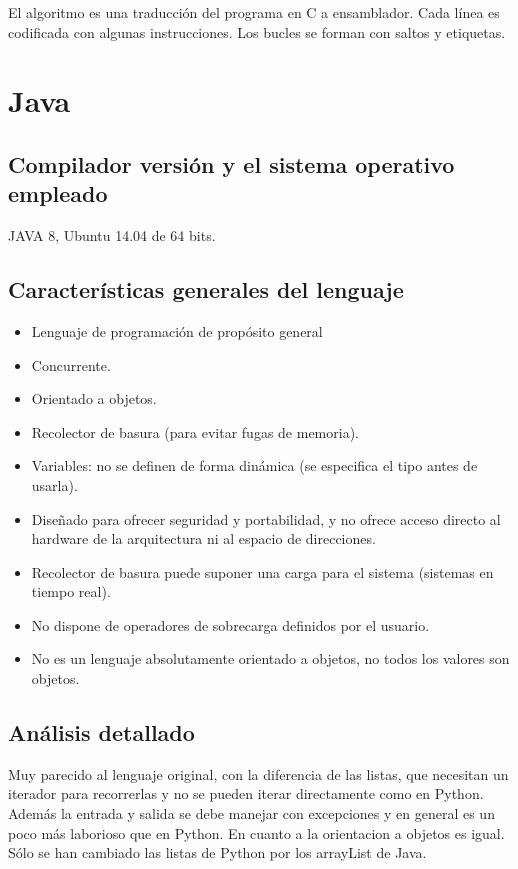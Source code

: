\documentclass[12pt,a4paper]{article}
\begin{document}
El algoritmo es una traducción del programa en C a ensamblador. Cada línea es 
codificada con algunas instrucciones. Los bucles se forman con saltos y 
etiquetas.

  
\section{Java}

\subsection{Compilador versión y el sistema operativo empleado}
JAVA 8, Ubuntu 14.04 de 64 bits.


\subsection{Características generales del lenguaje}
\begin{itemize}
\item Lenguaje de programación de propósito general
\item Concurrente.
\item Orientado a objetos.
\item Recolector de basura (para evitar fugas de memoria).
\item Variables: no se definen de forma dinámica (se especifica el tipo antes de 
usarla).
\item Diseñado para ofrecer seguridad y portabilidad, y no ofrece acceso directo 
al hardware de la arquitectura ni al espacio de direcciones.
\item Recolector de basura puede suponer una carga para el sistema (sistemas en 
tiempo real).
\item No dispone de operadores de sobrecarga definidos por el usuario.
\item No es un lenguaje absolutamente orientado a objetos, no todos los valores 
son objetos.
\end{itemize}


\subsection{Análisis detallado}
Muy parecido al lenguaje original, con la diferencia de las listas, que 
necesitan un iterador para recorrerlas y no se pueden iterar directamente como 
en Python. Además la entrada y salida se debe manejar con excepciones y en 
general es un poco más laborioso que en Python. En cuanto a la orientacion a 
objetos es igual. Sólo se han cambiado las listas de Python por los arrayList de 
Java.
\end{document}
